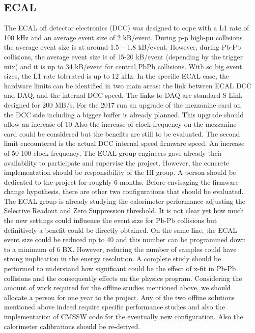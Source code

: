 \subsection{ECAL\label{subsec:ECAL}} 
The ECAL off detector electronics (DCC) was designed to cope with a L1 rate of 100 kHz and an average event size of 2
kB/event.  During p-p high-pu collisions the average event size is at around 1.5 – 1.8 kB/event. However, during Pb-Pb
collisions, the average event size is of 15-20 kB/event (depending by the trigger mix) and it is up to 34 kB/event for
central PbPb collisions. With so big event sizes, the L1 rate tolerated is up to 12 kHz. In the specific ECAL case, the
hardware limits can be identified in two main areas: the link between ECAL DCC and DAQ, and the internal DCC speed.  The
links to DAQ are standard S-Link designed for 200 MB/s. For the 2017 run an upgrade of the mezzanine card on the DCC
side including a bigger buffer is already planned. This upgrade should allow an increase of 10%
Also the increase of clock frequency on the mezzanine card could be considered but the benefits are still to be
evaluated. The second limit encountered is the actual DCC internal speed firmware speed. An increase of 50 %
100 %
clock frequency. The ECAL group engineers gave already their availability to participate and supervise the project.
However, the concrete implementation should be responsibility of the HI group. A person should be dedicated to the
project for roughly 6 months. Before envisaging the firmware change hypothesis, there are other two configurations that
should be evaluated. The ECAL group is already studying the calorimeter performance adjusting the Selective Readout and
Zero Suppression threshold. It is not clear yet how much the new settings could influence the event size for Pb-Pb
collisions but definitively a benefit could be directly obtained. On the same line, the ECAL event size could be reduced
up to 40 %
and this number can be programmed down to a minimum of 6 BX. However, reducing the number of samples could have strong
implication in the energy resolution. A complete study should be performed to understand how significant could be the
effect of x-fit in Pb-Pb collisions and the consequently effects on the physics program. Considering the amount of work
required for the offline studies mentioned above, we should allocate a person for one year to the project. Any of the
two offline solutions mentioned above indeed require specific performance studies and also the implementation of CMSSW
code for the eventually new configuration. Also the calorimeter calibrations should be re-derived. 




